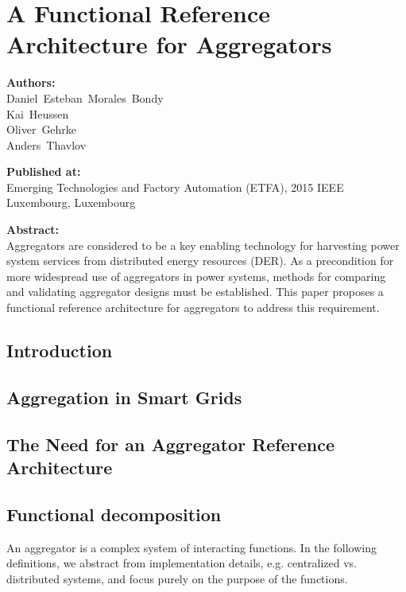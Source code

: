 \chapter{A Functional Reference Architecture for Aggregators}\label{app:etfa2015}

\textbf{Authors:}\\
	Daniel~Esteban~Morales~Bondy\\
	Kai~Heussen\\
	Oliver~Gehrke\\
	Anders~Thavlov

\noindent
\textbf{Published at:}\\
Emerging Technologies and Factory Automation (ETFA), 2015 IEEE\\
Luxembourg, Luxembourg

\noindent
	\textbf{Abstract:}\\
Aggregators are considered to be a key enabling technology for harvesting power system services from distributed energy resources (DER). As a precondition for more widespread use of aggregators in power systems, methods for comparing and validating aggregator designs must be established. This paper proposes a functional reference architecture for aggregators to address this requirement.


\section{Introduction}


\section{Aggregation in Smart Grids}
\label{sec:agginsg}

\section{The Need for an Aggregator Reference Architecture}
\label{sec:requirements}

\section{Functional decomposition}
\label{sec:funcdec}
An aggregator is a complex system of interacting functions. In the following definitions, we abstract from implementation details, e.g. centralized vs. distributed systems, and focus purely on the purpose of the functions. 

